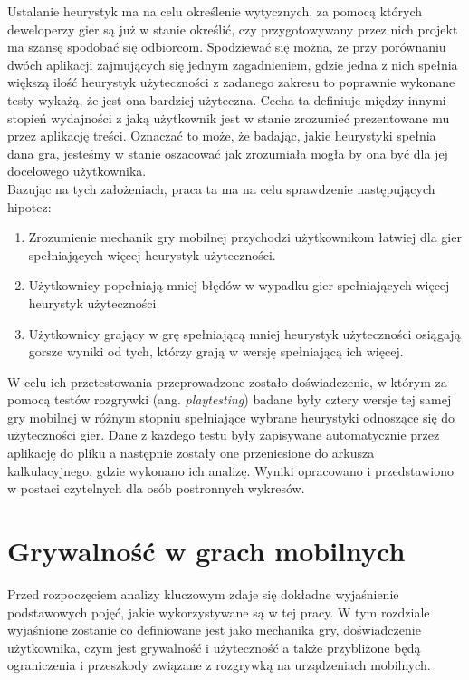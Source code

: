 \documentclass[a4paper,12pt,numbers=noenddot]{report}
\begin{document}
Ustalanie heurystyk ma na celu określenie wytycznych, za pomocą których deweloperzy gier są już w stanie określić, czy przygotowywany przez nich projekt ma szansę spodobać się odbiorcom. Spodziewać się można, że przy porównaniu dwóch aplikacji zajmujących się jednym zagadnieniem, gdzie jedna z nich spełnia większą ilość heurystyk użyteczności z zadanego zakresu to poprawnie wykonane testy wykażą, że jest ona bardziej użyteczna. Cecha ta definiuje między innymi stopień wydajności z jaką użytkownik jest w stanie zrozumieć prezentowane mu przez aplikację treści. Oznaczać to może, że badając, jakie heurystyki spełnia dana gra, jesteśmy w stanie oszacować jak zrozumiała mogła by ona być dla jej docelowego użytkownika.\\
Bazując na tych założeniach, praca ta ma na celu sprawdzenie następujących hipotez:

\begin{enumerate}
\item Zrozumienie mechanik gry mobilnej przychodzi użytkownikom łatwiej dla gier spełniających więcej heurystyk użyteczności.
\item Użytkownicy popełniają mniej błędów w wypadku gier spełniających więcej heurystyk użyteczności
\item Użytkownicy grający w grę spełniającą mniej heurystyk użyteczności osiągają gorsze wyniki od tych, którzy grają w wersję spełniającą ich więcej.
\end{enumerate}

W celu ich przetestowania przeprowadzone zostało doświadczenie, w którym za pomocą testów rozgrywki (ang. \textit{playtesting}) badane były cztery wersje tej samej gry mobilnej w różnym stopniu spełniające wybrane heurystyki odnoszące się do użyteczności gier. Dane z każdego testu były zapisywane automatycznie przez aplikację do pliku a następnie zostały one przeniesione do arkusza kalkulacyjnego, gdzie wykonano ich analizę. Wyniki opracowano i przedstawiono w postaci czytelnych dla osób postronnych wykresów.


\chapter{Grywalność w grach mobilnych}
Przed rozpoczęciem analizy kluczowym zdaje się dokładne wyjaśnienie podstawowych pojęć, jakie wykorzystywane są w tej pracy. W tym rozdziale wyjaśnione zostanie co definiowane jest jako mechanika gry, doświadczenie użytkownika, czym jest grywalność i użyteczność a także przybliżone będą ograniczenia i przeszkody związane z rozgrywką na urządzeniach mobilnych.
\end{document}
